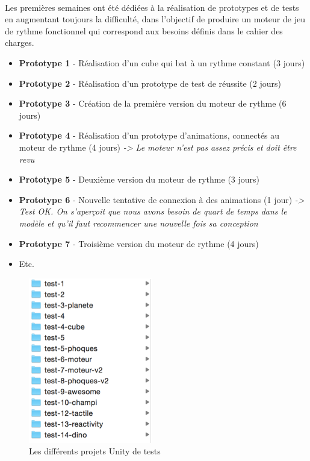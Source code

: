\paragraph{}
Les premières semaines ont été dédiées à la réalisation de prototypes et de tests en augmentant toujours la difficulté, dans l’objectif de produire un moteur de jeu de rythme fonctionnel qui correspond aux besoins définis dans le cahier des charges.

\begin{itemize}
\item \textbf{Prototype 1} - Réalisation d’un cube qui bat à un rythme constant (3 jours)
\item \textbf{Prototype 2} - Réalisation d’un prototype de test de réussite (2 jours)
\item \textbf{Prototype 3} - Création de la première version du moteur de rythme (6 jours)
\item \textbf{Prototype 4} - Réalisation d’un prototype d’animations, connectés au moteur de rythme (4 jours) \emph{-> Le moteur n’est pas assez précis et doit être revu}
\item \textbf{Prototype 5} - Deuxième version du moteur de rythme (3 jours)
\item \textbf{Prototype 6} - Nouvelle tentative de connexion à des animations (1 jour) \emph{-> Test OK. On s’aperçoit que nous avons besoin de quart de temps dans le modèle et qu’il faut recommencer une nouvelle fois sa conception}
\item \textbf{Prototype 7} - Troisième version du moteur de rythme (4 jours)
\item Etc.
\end{itemize}

\begin{figure}[H]\centering
  \includegraphics[scale=1]{./img/list-tests.png}
  \caption{Les différents projets Unity de tests}
  \label{listte}
\end{figure}

